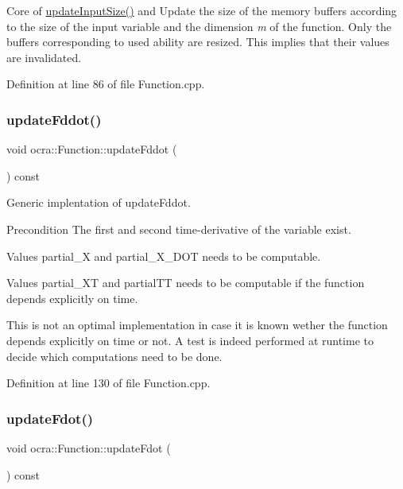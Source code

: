 Core of {\ttfamily \hyperlink{classocra_1_1Function_a3a5b9e6ae296339acc87ab2cbf97ef98}{update\+Input\+Size()}} and Update the size of the memory buffers according to the size of the input variable and the dimension {\itshape m} of the function. Only the buffers corresponding to used ability are resized. This implies that their values are invalidated. 

Definition at line 86 of file Function.\+cpp.

\hypertarget{classocra_1_1Function_a81490edf4f79b4dc730c5647e542231c}{}\label{classocra_1_1Function_a81490edf4f79b4dc730c5647e542231c} 
\subsubsection{\texorpdfstring{update\+Fddot()}{updateFddot()}}
{\footnotesize\ttfamily void ocra\+::\+Function\+::update\+Fddot (\begin{DoxyParamCaption}{ }\end{DoxyParamCaption}) const\hspace{0.3cm}{\ttfamily [virtual]}}

Generic implentation of update\+Fddot.

\begin{DoxyPrecond}{Precondition}
The first and second time-\/derivative of the variable exist. 

Values partial\+\_\+X and partial\+\_\+\+X\+\_\+\+D\+OT needs to be computable. 

Values partial\+\_\+\+XT and partial\+TT needs to be computable if the function depends explicitly on time.
\end{DoxyPrecond}
This is not an optimal implementation in case it is known wether the function depends explicitly on time or not. A test is indeed performed at runtime to decide which computations need to be done. 

Definition at line 130 of file Function.\+cpp.

\hypertarget{classocra_1_1Function_a2f09ce859333f22fdd527ff08aee6e6e}{}\label{classocra_1_1Function_a2f09ce859333f22fdd527ff08aee6e6e} 
\subsubsection{\texorpdfstring{update\+Fdot()}{updateFdot()}}
{\footnotesize\ttfamily void ocra\+::\+Function\+::update\+Fdot (\begin{DoxyParamCaption}{ }\end{DoxyParamCaption}) const\hspace{0.3cm}{\ttfamily [virtual]}}

